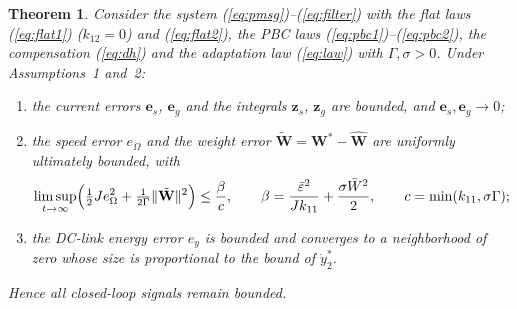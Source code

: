 \documentclass[11pt,a4paper]{article}
\newtheorem{theorem}{Theorem}
\newcommand{\bv}[1]{\mathbf{#1}}
\begin{document}
\begin{theorem}
Consider the system (\ref{eq:pmsg})--(\ref{eq:filter}) with the flat laws (\ref{eq:flat1}) ($k_{12}=0$)
and (\ref{eq:flat2}), the PBC laws (\ref{eq:pbc1})--(\ref{eq:pbc2}), the compensation (\ref{eq:dh}) and
the adaptation law (\ref{eq:law}) with $\Gamma,\sigma>0$. Under Assumptions~1 and~2:
\begin{enumerate}[label=(\roman*),leftmargin=*,itemsep=1pt]
\item the current errors $\bv{e}_s$, $\bv{e}_g$ and the integrals $\bv{z}_s$, $\bv{z}_g$ are bounded, and
$\bv{e}_s,\bv{e}_g\to0$;
\item the speed error $e_\Omega$ and the weight error $\tilde{\bv{W}}=\bv{W}^*-\hat{\bv{W}}$ are uniformly
ultimately bounded, with
\begin{equation}
\limsup_{t\to\infty}\Bigl(\tfrac12Je_\Omega^2+\tfrac{1}{2\Gamma}\|\tilde{\bv{W}}\|^2\Bigr)\le\frac{\beta}{c},
\qquad \beta=\frac{\bar\varepsilon^2}{Jk_{11}}+\frac{\sigma\bar W^2}{2},\qquad c=\min(k_{11},\sigma\Gamma);
\label{eq:bound}
\end{equation}
\item the DC-link energy error $e_y$ is bounded and converges to a neighborhood of zero whose size is
proportional to the bound of $\dot y_2^*$.
\end{enumerate}
Hence all closed-loop signals remain bounded.
\end{theorem}
\end{document}
